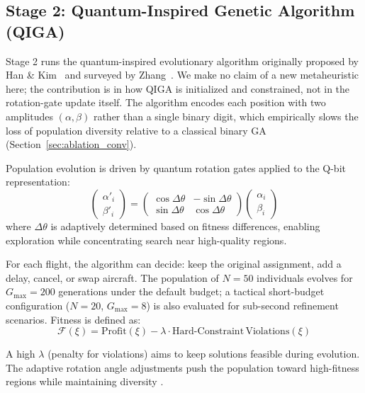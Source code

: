 \documentclass[12pt,number]{elsarticle}
\begin{document}
\subsection{Stage 2: Quantum-Inspired Genetic Algorithm (QIGA)}

Stage 2 runs the quantum-inspired evolutionary algorithm originally proposed by Han \& Kim~\cite{han2002} and surveyed by Zhang~\cite{zhang2011}. We make no claim of a new metaheuristic here; the contribution is in how QIGA is initialized and constrained, not in the rotation-gate update itself. The algorithm encodes each position with two amplitudes $(\alpha, \beta)$ rather than a single binary digit, which empirically slows the loss of population diversity relative to a classical binary GA (Section~\ref{sec:ablation_conv}).

Population evolution is driven by quantum rotation gates applied to the Q-bit representation:
\begin{equation}
\begin{pmatrix} \alpha'_i \\ \beta'_i \end{pmatrix} = \begin{pmatrix} \cos\Delta\theta & -\sin\Delta\theta \\ \sin\Delta\theta & \cos\Delta\theta \end{pmatrix} \begin{pmatrix} \alpha_i \\ \beta_i \end{pmatrix}
\label{eq:rotation}
\end{equation}
where $\Delta\theta$ is adaptively determined based on fitness differences, enabling exploration while concentrating search near high-quality regions.

For each flight, the algorithm can decide: keep the original assignment, add a delay, cancel, or swap aircraft. The population of $N = 50$ individuals evolves for $G_{\max} = 200$ generations under the default budget; a tactical short-budget configuration ($N = 20$, $G_{\max} = 8$) is also evaluated for sub-second refinement scenarios. Fitness is defined as:
\begin{equation}
\mathcal{F}(\xi) = \mathrm{Profit}(\xi) - \lambda \cdot \mathrm{Hard\text{-}Constraint\,Violations}(\xi)
\label{eq:fitness}
\end{equation}

A high $\lambda$ (penalty for violations) aims to keep solutions feasible during evolution. The adaptive rotation angle adjustments push the population toward high-fitness regions while maintaining diversity \cite{han2002}.
\end{document}

